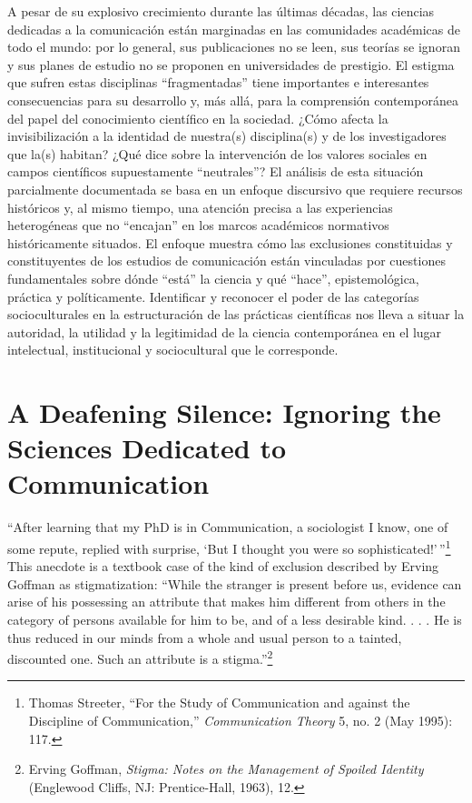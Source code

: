 \documentclass{tufte-handout}
\begin{document}
A pesar de su explosivo crecimiento durante las últimas décadas, las
ciencias dedicadas a la comunicación están marginadas en las comunidades
académicas de todo el mundo: por lo general, sus publicaciones no se
leen, sus teorías se ignoran y sus planes de estudio no se proponen en
universidades de prestigio. El estigma que sufren estas disciplinas
``fragmentadas'' tiene importantes e interesantes consecuencias para su
desarrollo y, más allá, para la comprensión contemporánea del papel del
conocimiento científico en la sociedad. ¿Cómo afecta la invisibilización
a la identidad de nuestra(s) disciplina(s) y de los investigadores que
la(s) habitan? ¿Qué dice sobre la intervención de los valores sociales
en campos científicos supuestamente ``neutrales''? El análisis de esta
situación parcialmente documentada se basa en un enfoque discursivo que
requiere recursos históricos y, al mismo tiempo, una atención precisa a
las experiencias heterogéneas que no ``encajan'' en los marcos
académicos normativos históricamente situados. El enfoque muestra cómo
las exclusiones constituidas y constituyentes de los estudios de
comunicación están vinculadas por cuestiones fundamentales sobre dónde
``está'' la ciencia y qué ``hace'', epistemológica, práctica y
políticamente. Identificar y reconocer el poder de las categorías
socioculturales en la estructuración de las prácticas científicas nos
lleva a situar la autoridad, la utilidad y la legitimidad de la ciencia
contemporánea en el lugar intelectual, institucional y sociocultural que
le corresponde.

\newpage

\hypertarget{a-deafening-silence-ignoring-the-sciences-dedicated-to-communication}{%
\section{A Deafening Silence: Ignoring the Sciences Dedicated to
\\\noindent Communication}\label{a-deafening-silence-ignoring-the-sciences-dedicated-to-communication}}

``After learning that my PhD is in Communication, a sociologist I know,
one of some repute, replied with surprise, `But I thought
you were so
sophisticated!'\,''\footnote{Thomas Streeter, ``For the Study of
  Communication and against the Discipline of Communication,''
  \emph{Communication Theory} 5, no. 2 (May 1995): 117.} This anecdote
is a textbook case of the kind of exclusion described by Erving Goffman
as stigmatization: ``While the stranger is present before us, evidence
can arise of his possessing an attribute that makes him different from
others in the category of persons available for him to be, and of a less
desirable kind. . . . He is thus reduced in our minds from a whole and
usual person to a tainted, discounted one. Such an attribute is a
stigma.''\footnote{Erving Goffman, \emph{Stigma: Notes on the Management
  of Spoiled Identity} (Englewood Cliffs, NJ: Prentice-Hall, 1963), 12.}
  
\end{document}
